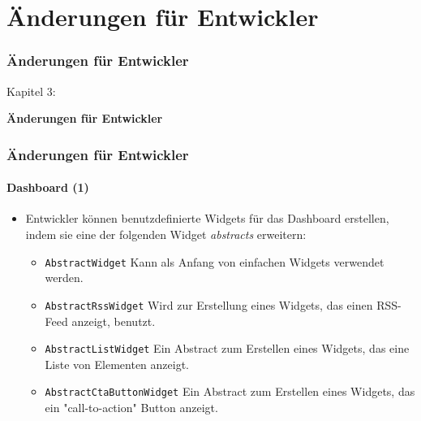 %

\section{Änderungen für Entwickler}
\begin{frame}[fragile]
	\frametitle{Änderungen für Entwickler}

	\begin{center}\huge{Kapitel 3:}\end{center}
	\begin{center}\huge{\color{typo3darkgrey}\textbf{Änderungen für Entwickler}}\end{center}

\end{frame}


\begin{frame}[fragile]
	\frametitle{Änderungen für Entwickler}
	\framesubtitle{Dashboard (1)}

	\lstset{basicstyle=\smaller\ttfamily}

	\begin{itemize}
		\item Entwickler können benutzdefinierte Widgets für das Dashboard erstellen, indem sie eine der folgenden  Widget \textit{abstracts} erweitern:

			\begin{itemize}
				\item \texttt{AbstractWidget}\newline
					\small
						Kann als Anfang von einfachen Widgets verwendet werden.
					\normalsize
				\item \texttt{AbstractRssWidget}\newline
					\small
						Wird zur Erstellung eines Widgets, das einen RSS-Feed anzeigt, benutzt.
					\normalsize
				\item \texttt{AbstractListWidget}\newline
					\small
						Ein Abstract zum Erstellen eines Widgets, das eine Liste von Elementen anzeigt.
					\normalsize
				\item \texttt{AbstractCtaButtonWidget}\newline
					\small
						Ein Abstract zum Erstellen eines Widgets, das ein "call-to-action" Button anzeigt.
					\normalsize
			\end{itemize}

	\end{itemize}

\end{frame}

